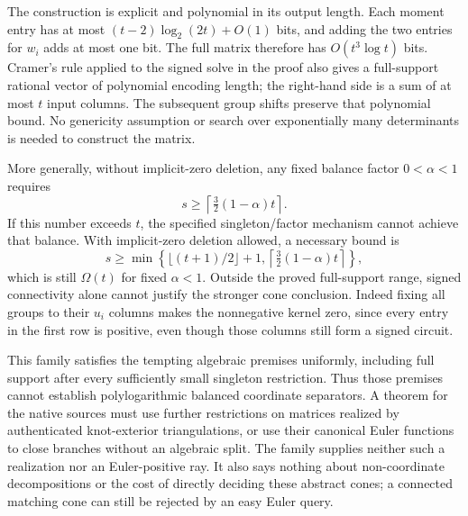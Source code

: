 The construction is explicit and polynomial in its output length.  Each
moment entry has at most $(t-2)\log_2(2t)+O(1)$ bits, and adding the two
entries for $w_i$ adds at most one bit.  The full matrix therefore has
$O(t^3\log t)$ bits.  Cramer's rule applied to the signed solve in the proof
also gives a full-support rational vector of polynomial encoding length;
the right-hand side is a sum of at most $t$ input columns.  The subsequent
group shifts preserve that polynomial bound.  No genericity assumption or
search over exponentially many determinants is needed to construct the
matrix.

More generally, without implicit-zero deletion, any fixed balance factor
$0<\alpha<1$ requires
\[
                s\ge\left\lceil\tfrac32(1-\alpha)t\right\rceil.
\]
If this number exceeds $t$, the specified singleton/factor mechanism cannot
achieve that balance.  With implicit-zero deletion allowed, a necessary
bound is
\[
 s\ge\min\left\{\lfloor(t+1)/2\rfloor+1,
                 \left\lceil\tfrac32(1-\alpha)t\right\rceil\right\},
\]
which is still $\Omega(t)$ for fixed $\alpha<1$.  Outside the proved
full-support range, signed connectivity alone cannot justify the stronger
cone conclusion.  Indeed fixing all groups to their $u_i$ columns makes the
nonnegative kernel zero, since every entry in the first row is positive,
even though those columns still form a signed circuit.

This family satisfies the tempting algebraic premises uniformly, including
full support after every sufficiently small singleton restriction.  Thus
those premises cannot establish polylogarithmic balanced coordinate
separators.  A theorem for the native sources must use further restrictions
on matrices realized by authenticated knot-exterior triangulations, or use
their canonical Euler functions to close branches without an algebraic
split.  The family supplies neither such a realization nor an Euler-positive
ray.  It also says nothing about non-coordinate decompositions or the cost
of directly deciding these abstract cones; a connected matching cone can
still be rejected by an easy Euler query.
